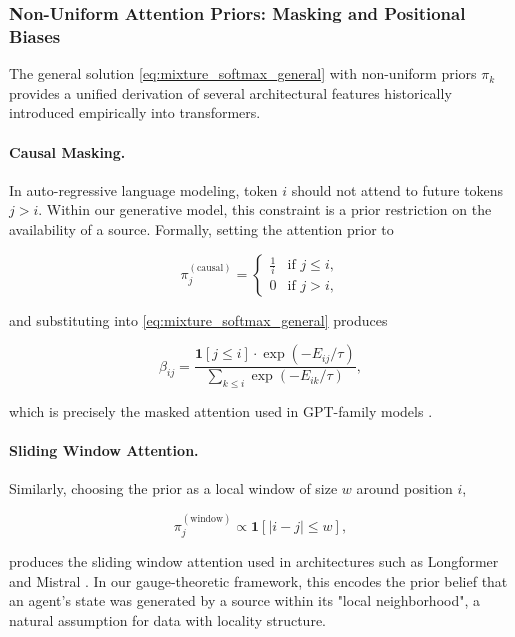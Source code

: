 \documentclass[twoside,11pt]{article}
\begin{document}
\subsubsection{Non-Uniform Attention Priors: Masking and Positional Biases}
\label{sec:nonuniform_priors}

The general solution \eqref{eq:mixture_softmax_general} with non-uniform priors $\pi_k$ provides a unified derivation of several architectural features historically introduced empirically into transformers. 

\paragraph{Causal Masking.}
In auto-regressive language modeling, token $i$ should not attend to future tokens $j > i$. Within our generative model, this constraint is a prior restriction on the availability of a source. Formally, setting the attention prior to

\begin{equation}
\pi_j^{(\text{causal})} = \begin{cases} \frac{1}{i} & \text{if } j \leq i, \\ 0 & \text{if } j > i, \end{cases}
\label{eq:causal_prior}
\end{equation}

and substituting into \eqref{eq:mixture_softmax_general} produces

\begin{equation}
\beta_{ij} = \frac{\mathbf{1}[j \leq i] \cdot \exp(-E_{ij}/\tau)}{\sum_{k \leq i} \exp(-E_{ik}/\tau)},
\label{eq:causal_attention}
\end{equation}

which is precisely the masked attention used in GPT-family models \citep{radford2019language}. 

\paragraph{Sliding Window Attention.}
Similarly, choosing the prior as a local window of size $w$ around position $i$,

\begin{equation}
\pi_j^{(\text{window})} \propto \mathbf{1}[|i - j| \leq w],
\label{eq:window_prior}
\end{equation}

produces the sliding window attention used in architectures such as Longformer \citep{beltagy2020longformer} and Mistral \citep{jiang2023mistral}. In our gauge-theoretic framework, this encodes the prior belief that an agent's state was generated by a source within its "local neighborhood", a natural assumption for data with locality structure.
\end{document}
